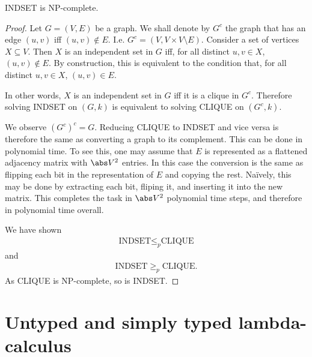 \documentclass{article}
\begin{document}
\begin{claim*}
	INDSET is NP-complete.
	\begin{proof}
		Let $G=(V,E)$ be a graph. We shall denote by $G^c$ the graph that has an edge $(u,v)$ iff $(u,v)\not\in E$.
		I.e. $G^c=(V, V\times V\setminus E)$. Consider a set of vertices $X\subseteq V$. Then $X$ is an
		independent set in $G$ iff, for all distinct $u,v\in X$, $(u,v)\not\in E$. By construction, this is equivalent to
		the condition that, for all distinct $u,v\in X$, $(u,v)\in E$.

		In other words, $X$ is an independent set in $G$ iff it is a clique in $G^c$. Therefore solving
		INDSET on $(G, k)$ is equivalent to solving CLIQUE on $(G^c, k)$.

		We observe $(G^c)^c=G$. Reducing CLIQUE to INDSET and vice versa is therefore the same as converting
		a graph to its complement. This can be done in polynomial time. To see this, one may assume that
		$E$ is represented as a flattened adjacency matrix with $\abs V^2$ entries. In this case the
		conversion is the same as flipping each bit in the representation of $E$ and copying the rest.
		Na\"ively, this may be done by extracting each bit, fliping it, and inserting it into the new
		matrix. This completes the task in $\abs V^2$ polynomial time steps, and therefore in polynomial time
		overall.

		We have shown
		\begin{align}
			\text{INDSET} \leq_p \text{CLIQUE}
		\end{align}
		and
		\begin{align}
			\text{INDSET} \geq_p \text{CLIQUE}.
		\end{align}
		As CLIQUE is NP-complete, so is INDSET.
	\end{proof}
\end{claim*}

\section{Untyped and simply typed lambda-calculus}

\newcommand{\betareduce}{\xrightarrow{\beta}}
\newcommand{\alphareduce}{\xrightarrow{\alpha}}
\end{document}
